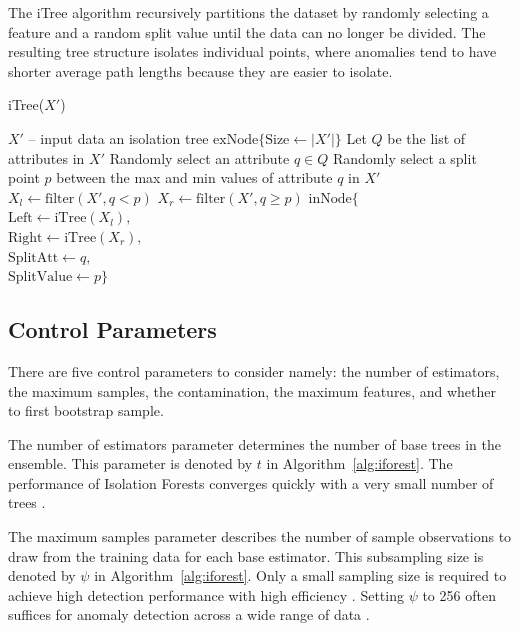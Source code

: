 \documentclass[10pt, conference]{IEEEtran}
\begin{document}
The iTree algorithm recursively partitions the dataset by randomly selecting a feature and a random split value until the data can no longer be divided. The resulting tree structure isolates individual points, where anomalies tend to have shorter average path lengths because they are easier to isolate.

\begin{algorithm}[H]
	\caption{iTree($X'$)}
	\label{alg:itree}
	\begin{algorithmic}[1]
		\Require $X'$ -- input data  
		\Ensure an isolation tree
		\Return $\text{exNode}\{\text{Size} \leftarrow |X'|\}$
		\Else
		\State Let $Q$ be the list of attributes in $X'$
		\State Randomly select an attribute $q \in Q$
		\State Randomly select a split point $p$ between the max and min values of attribute $q$ in $X'$
		\State $X_l \gets \text{filter}(X', q < p)$
		\State $X_r \gets \text{filter}(X', q \ge p)$
		\Return $\text{inNode}\{$ \\
		\hspace*{1.5em} $\text{Left} \leftarrow \text{iTree}(X_l),$ \\
		\hspace*{1.5em} $\text{Right} \leftarrow \text{iTree}(X_r),$ \\
		\hspace*{1.5em} $\text{SplitAtt} \leftarrow q,$ \\
		\hspace*{1.5em} $\text{SplitValue} \leftarrow p\}$ 
		\EndIf
	\end{algorithmic}
\end{algorithm}


\subsection{Control Parameters}
There are five control parameters to consider namely: the number of estimators, the maximum samples, the contamination, the maximum features, and whether to first bootstrap sample.

The number of estimators parameter determines the number of base trees in the ensemble. This parameter is denoted by $t$ in Algorithm~\ref{alg:iforest}. The performance of Isolation Forests converges quickly with a very small number of trees \cite{iforest}.


The maximum samples parameter describes the number of sample observations to draw from the training data for each base estimator. This subsampling size is denoted by $\psi$ in Algorithm~\ref{alg:iforest}. Only a small sampling size is required to achieve high detection performance with high efficiency \cite{iforest}. Setting $\psi$ to 256 often suffices for anomaly detection across a wide range of data \cite{iforest2}.
\end{document}
